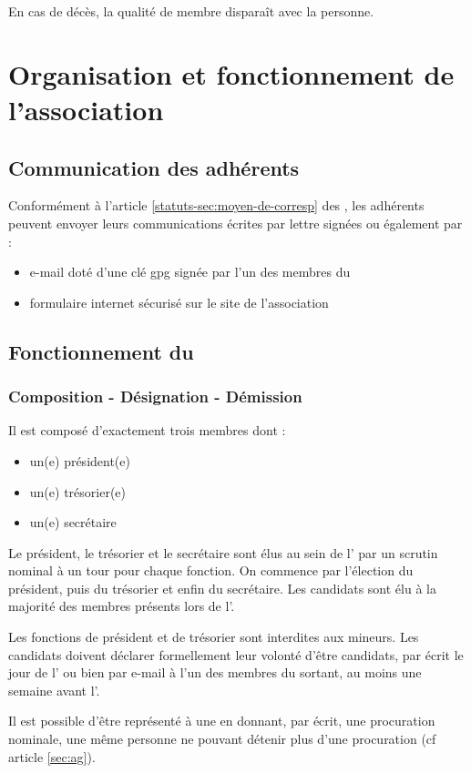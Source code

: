 \documentclass[a4paper,french,10pt]{article}
\newcommand{\article}[1]{\subsection{#1}\addtocounter{article}{1}}
\newcounter{article}
\newcommand{\artref}[1]{article \ref{#1}}
\newcommand{\artrefst}[1]{article \ref{statuts-#1} des \statuts{}}
\begin{document}
En cas de décès, la qualité de membre disparaît avec la personne.

\section{Organisation et fonctionnement de l'association}

\article{Communication des adhérents}
\label{sec:comm-des-adher}

Conformément à l'\artrefst{sec:moyen-de-corresp}, les adhérents peuvent envoyer leurs communications écrites par lettre signées ou également par :
\begin{itemize}
\item e-mail doté d'une clé gpg signée par l'un des membres du \bureau{}
\item formulaire internet sécurisé sur le site de l'association
\end{itemize}


\article{Fonctionnement du \bureau{}}
\label{sec:fonct-du-bure}

\subsubsection*{Composition - Désignation - Démission}
\label{sec:comp-design}
Il est composé d'exactement trois membres dont :
\begin{itemize}
\item un(e) président(e)
\item un(e) trésorier(e)
\item un(e) secrétaire
\end{itemize}

Le président, le trésorier et le secrétaire sont élus au sein de l'\AG{} par un scrutin nominal à un tour pour chaque fonction. On commence par l'élection du président, puis du trésorier et enfin du secrétaire.  Les candidats sont élu à la majorité des membres présents lors de l'\AG{}.

Les fonctions de président et de trésorier sont interdites aux mineurs. Les candidats doivent déclarer formellement leur volonté d'être candidats, par écrit le jour de l'\AG{} ou bien par e-mail à l'un des membres du \bureau{} sortant, au moins une semaine avant l'\AG{}.


Il est possible d’être représenté à une \AG{} en donnant, par écrit, une procuration nominale, une même personne ne pouvant détenir plus
d’une procuration (cf \artref{sec:ag}).
\end{document}
